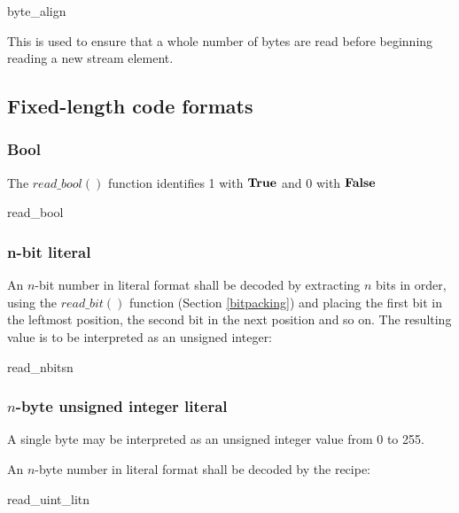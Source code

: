 \begin{pseudo}{byte\_align}{}
\bsEND
\end{pseudo}

This is used to ensure that a whole number of bytes are read before
beginning reading a new stream element.

\subsection{Fixed-length code formats}
\subsubsection{Bool}

The $read\_bool()$ function identifies 1 with $\text{\bf{True}}$ and 0 with $\text{\bf{False}}$
\begin{pseudo}{read\_bool}{}
    \bsRET{\true}
\bsELSE
    \bsRET{\false}
\bsEND
\end{pseudo}

\subsubsection{n-bit literal}
An $n$-bit number in literal format shall be decoded by extracting $n$ bits
in order, using the $read\_bit()$ function (Section \ref{bitpacking})
 and placing the first bit in the leftmost position, the second
bit in the next position and so on. The resulting value is to be
interpreted as an unsigned integer:

\begin{pseudo}{read\_nbits}{n}
\bsEND
{}
\end{pseudo}

\subsubsection{$n$-byte unsigned integer literal}
A single byte may be interpreted as an unsigned integer value from 0 to 255.

An $n$-byte number in literal format shall be decoded by the recipe:

\begin{pseudo}{read\_uint\_lit}{n}
\bsEND
{}
\end{pseudo}

